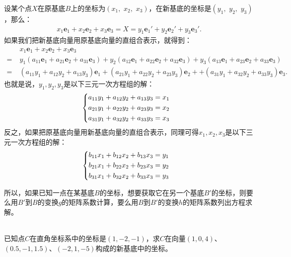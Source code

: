 \documentclass[12pt,UTF8]{ctexbook}
\begin{document}
设某个点$X$在原基底$B$上的坐标为$(x_1,\,\, x_2, \,\,x_3)$，在新基底的坐标是$(y_1,\,\,y_2,\,\,y_3)$，那么：
\begin{align*}
    x_1\mathbf{e}_1 + x_2\mathbf{e}_2 + x_3\mathbf{e}_3 = X = y_1\mathbf{e}_1' + y_2\mathbf{e}_2' + y_3\mathbf{e}_3'.
\end{align*}
如果我们把新基底向量用原基底向量的直组合表示，就得到：
\begin{align*}
    &x_1\mathbf{e}_1 + x_2\mathbf{e}_2 + x_3\mathbf{e}_3 \\ 
    =\;& y_1(a_{11}\mathbf{e}_1 + a_{21}\mathbf{e}_2 + a_{31}\mathbf{e}_3) + y_2(a_{12}\mathbf{e}_1 + a_{22}\mathbf{e}_2 + a_{32}\mathbf{e}_3) + y_3(a_{13}\mathbf{e}_1 + a_{23}\mathbf{e}_2 + a_{33}\mathbf{e}_3)  \\ 
    =\;& (a_{11}y_1 + a_{12}y_2 + a_{13}y_3)\mathbf{e}_1 + (a_{21}y_1 + a_{22}y_2 + a_{23}y_3)\mathbf{e}_2 +  + (a_{31}y_1 + a_{32}y_2 + a_{33}y_3)\mathbf{e}_3. 
\end{align*}
也就是说，$y_1,y_2,y_3$是以下三元一次方程组的解：
\begin{alignat*}{1}
    &   \begin{dcases}
            a_{11}y_1 + a_{12}y_2 + a_{13}y_3 = x_1 \\
            a_{21}y_1 + a_{22}y_2 + a_{23}y_3 = x_2 \\
            a_{31}y_1 + a_{32}y_2 + a_{33}y_3 = x_3
        \end{dcases}
\end{alignat*}
反之，如果把原基底向量用新基底向量的直组合表示，同理可得$x_1,x_2,x_3$是以下三元一次方程组的解：
\begin{alignat*}{1}
    &   \begin{dcases}
            b_{11}x_1 + b_{12}x_2 + b_{13}x_3 = y_1 \\
            b_{21}x_1 + b_{22}x_2 + b_{23}x_3 = y_2 \\
            b_{31}x_1 + b_{32}x_2 + b_{33}x_3 = y_3
        \end{dcases}
\end{alignat*}

所以，如果已知一点在某基底$B$的坐标，想要获取它在另一个基底$B'$的坐标，则要么用$B'$到$B$的变换$g$的矩阵系数计算，要么用$B$到$B'$的变换$h$的矩阵系数列出方程求解。

\begin{et}
    \mbox{} \\
    已知点$C$在直角坐标系中的坐标是$(1,-2,-1)$，求$C$在向量$(1,0,4)$、$(0.5,-1,1.5)$、$(-2,1,-5)$构成的新基底中的坐标。
\end{et}
\end{document}
